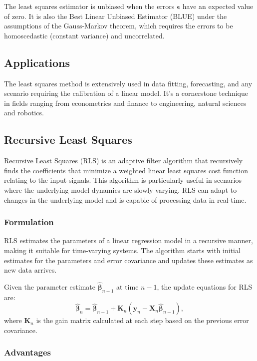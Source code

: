\documentclass[12pt,a4paper,oneside,onecolumn]{book}
\begin{document}
The least squares estimator is unbiased when the errors \( \boldsymbol{\epsilon} \) have an expected value of zero. It is also the Best Linear Unbiased Estimator (BLUE) under the assumptions of the Gauss-Markov theorem, which requires the errors to be homoscedastic (constant variance) and uncorrelated.

\subsection{Applications}

The least squares method is extensively used in data fitting, forecasting, and any scenario requiring the calibration of a linear model. It's a cornerstone technique in fields ranging from econometrics and finance to engineering, natural sciences and robotics.

\subsection{Recursive Least Squares}

Recursive Least Squares (RLS) is an adaptive filter algorithm that recursively finds the coefficients that minimize a weighted linear least squares cost function relating to the input signals. This algorithm is particularly useful in scenarios where the underlying model dynamics are slowly varying. RLS can adapt to changes in the underlying model and is capable of processing data in real-time.

\subsubsection{Formulation}

RLS estimates the parameters of a linear regression model in a recursive manner, making it suitable for time-varying systems. The algorithm starts with initial estimates for the parameters and error covariance and updates these estimates as new data arrives.

Given the parameter estimate \( \hat{\boldsymbol{\beta}}_{n-1} \) at time \( n-1 \), the update equations for RLS are:
\[ \hat{\boldsymbol{\beta}}_n = \hat{\boldsymbol{\beta}}_{n-1} + \mathbf{K}_n (\mathbf{y}_n - \mathbf{X}_n \hat{\boldsymbol{\beta}}_{n-1}), \]
where \( \mathbf{K}_n \) is the gain matrix calculated at each step based on the previous error covariance.

\subsubsection{Advantages}
\end{document}
